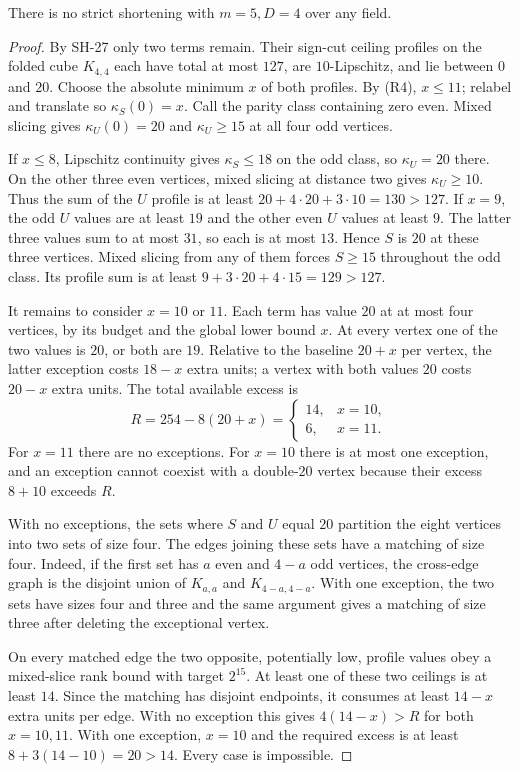 \begin{proposition}
\label{prop:width-five-dimension-four}
There is no strict shortening with $m=5,D=4$ over any field.
\end{proposition}
\begin{proof}
By SH-27 only two terms remain.  Their sign-cut ceiling
profiles on the folded cube $K_{4,4}$ each have total at
most $127$, are $10$-Lipschitz, and lie between $0$ and $20$.
Choose the absolute minimum $x$ of both profiles.  By (R4),
$x\le11$; relabel and translate so $\kappa_S(0)=x$.
Call the parity class containing zero even.  Mixed slicing
gives $\kappa_U(0)=20$ and $\kappa_U\ge15$ at all four
odd vertices.

If $x\le8$, Lipschitz continuity gives
$\kappa_S\le18$ on the odd class, so $\kappa_U=20$
there.  On the other three even vertices, mixed slicing
at distance two gives $\kappa_U\ge10$.
Thus the sum of the $U$ profile is at least
$20+4\cdot20+3\cdot10=130>127$.
If $x=9$, the odd $U$ values are at least $19$ and
the other even $U$ values at least $9$.
The latter three values sum to at most $31$, so each
is at most $13$.  Hence $S$ is $20$ at these three
vertices.  Mixed slicing from any of them forces
$S\ge15$ throughout the odd class.  Its profile sum
is at least $9+3\cdot20+4\cdot15=129>127$.

It remains to consider $x=10$ or $11$.
Each term has value $20$ at at most four vertices,
by its budget and the global lower bound $x$.
At every vertex one of the two values is $20$, or
both are $19$.  Relative to the baseline $20+x$
per vertex, the latter exception costs $18-x$
extra units; a vertex with both values $20$ costs
$20-x$ extra units.  The total available excess is
\[
 R=254-8(20+x)=
 \begin{cases}14,&x=10,\\6,&x=11.\end{cases}
\]
For $x=11$ there are no exceptions.  For $x=10$
there is at most one exception, and an exception
cannot coexist with a double-$20$ vertex because
their excess $8+10$ exceeds $R$.

With no exceptions, the sets where $S$ and $U$
equal $20$ partition the eight vertices into two
sets of size four.  The edges joining these sets
have a matching of size four.  Indeed, if the
first set has $a$ even and $4-a$ odd vertices,
the cross-edge graph is the disjoint union of
$K_{a,a}$ and $K_{4-a,4-a}$.
With one exception, the two sets have sizes four
and three and the same argument gives a matching
of size three after deleting the exceptional vertex.

On every matched edge the two opposite, potentially
low, profile values obey a mixed-slice rank bound
with target $2^{15}$.  At least one of these two
ceilings is at least $14$.  Since the matching has
disjoint endpoints, it consumes at least $14-x$
extra units per edge.  With no exception this gives
$4(14-x)>R$ for both $x=10,11$.  With one exception,
$x=10$ and the required excess is at least
$8+3(14-10)=20>14$.  Every case is impossible.
\end{proof}

